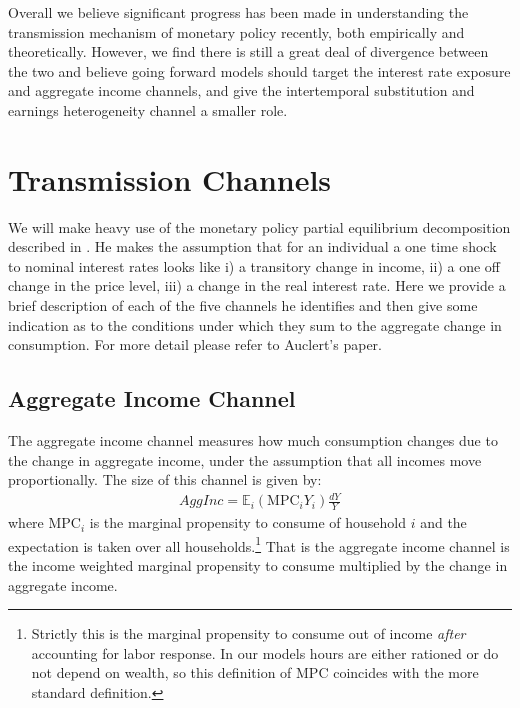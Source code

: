 \documentclass[titlepage]{\econtex}\newcommand{\texname}{ConsumptionHeterogeneity}
\begin{document}
Overall we believe significant progress has been made in understanding the transmission mechanism of monetary policy recently, both empirically and theoretically. However, we find there is still a great deal of divergence between the two and believe going forward models should target the interest rate exposure and aggregate income channels, and give the intertemporal substitution and earnings heterogeneity channel a smaller role.

\section{Transmission Channels} \label{transmission_channels}
We will make heavy use of the monetary policy partial equilibrium decomposition described in \cite{auclert_monetary_2017}. He makes the assumption that for an individual a one time shock to nominal interest rates looks like i) a transitory change in income, ii) a one off change in the price level, iii) a change in the real interest rate. Here we provide a brief description of each of the five channels he identifies and then give some indication as to the conditions under which they sum to the aggregate change in consumption. For more detail please refer to Auclert's paper.

\subsection{Aggregate Income Channel}
The aggregate income channel measures how much consumption changes due to the change in aggregate income, under the assumption that all incomes move proportionally. The size of this channel is given by:
\begin{align}
\textit{AggInc} = \mathbb{E}_i \left( \text{MPC}_i Y_i  \right) \frac{dY}{Y}
\end{align}
where $\text{MPC}_i$ is the marginal propensity to consume of household $i$ and the expectation is taken over all households.\footnote{Strictly this is the marginal propensity to consume out of income \textit{after} accounting for labor response. In our models hours are either rationed or do not depend on wealth, so this definition of MPC coincides with the more standard definition.} That is the aggregate income channel is the income weighted marginal propensity to consume multiplied by the change in aggregate income.
\end{document}
